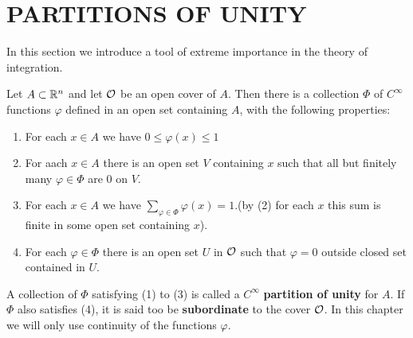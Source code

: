 \clearpage
\section[\textsc{partitions of unity}]{PARTITIONS OF UNITY}
In this section we introduce a tool of extreme importance in
the theory of integration.

\begin{theorem}
    Let $A \subset \mathbb{R}^n$ and let $\mathcal{O}$ be an open cover of $A$.
    Then there is a collection $\Phi$ of $C^\infty$ functions $\varphi$ defined in an open
    set containing $A$, with the following properties:
    \begin{enumerate}[label=\upshape{(\arabic*)}]
        \item For each $x\in A$ we have $0\le \varphi(x)\le 1$ 
        \item For aach $x\in A$ there is an open set $V$ containing $x$ such that 
            all but finitely many $\varphi\in \Phi$ are 0 on $V$.
        \item For each $x\in A$ we have $\sum_{\varphi\in \Phi}\varphi(x)=1$.(by (2) for each 
            $x$ this sum is finite in some open set containing $x$).
        \item For each $\varphi\in \Phi$ there is an open set $U$ in $\mathcal{O}$ 
            such that $\varphi=0$ outside closed set contained in $U$. 
    \end{enumerate}
\end{theorem}

A collection of $\Phi$ satisfying (1) to (3) is called a $C^\infty$ \textbf{partition of unity}
for $A$. If $\Phi$ also satisfies (4), it is said too be \textbf{subordinate} to the cover $\mathcal{O}$.
In this chapter we will only use continuity of the functions $\varphi$.

